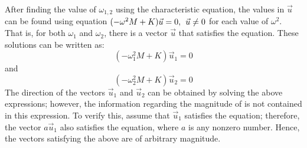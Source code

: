 \documentclass[12pt,letter]{article}
\begin{document}
After finding the value of $\omega_{1,2}$ using the characteristic equation, the values in $\vec{u}$ can be found using equation $(-\omega^2 M  + K)\vec{u} =0, \hspace{1ex} \vec{u}\neq0$ for each value of $\omega^2$. That is, for both $\omega_1$ and $\omega_2$, there is a vector  $\vec{u}$ that satisfies the equation. These solutions can be written as:
\begin{equation}
 (-\omega_1^2 M  + K)\vec{u}_1 =0
\end{equation}
and 
\begin{equation}
 (-\omega_2^2 M  + K)\vec{u}_2 =0
\end{equation}
The direction of the vectors $\vec{u}_1$ and $\vec{u}_2$ can be obtained by solving the above expressions; however, the information regarding the magnitude of is not contained in this expression. To verify this, assume that $\vec{u}_1$ satisfies the equation; therefore, the vector $a\vec{u}_1$ also satisfies the equation, where $a$ is any nonzero number. Hence, the vectors satisfying the above are of arbitrary magnitude.
\end{document}
